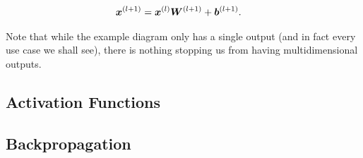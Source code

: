 \documentclass[Thesis.tex]{subfiles}
\begin{document}
\begin{align}
  \bm{x}^{(l+1)} &= \bm{x}^{(l)}\bm{W}^{(l+1)} + \bm{b}^{(l+1)}.
\end{align}

Note that while the example diagram only has a single output (and in fact every
use case we shall see), there is nothing stopping us from having
multidimensional outputs.


\subsection{Activation Functions}

\subsection{Backpropagation}
\end{document}
